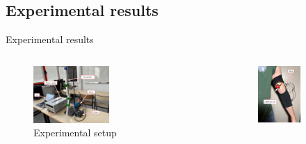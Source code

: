 \documentclass[aspectratio=169]{beamer}
\begin{document}
\subsection{Experimental results}
\begin{frame}{Experimental results}
\begin{columns}
\begin{column}{0.5\textwidth}
\begin{figure}[htbp]
  \centering
  \includegraphics[width=0.6\textwidth]{setup.png}
  \caption{Experimental setup}
  \label{fig:setup}
\end{figure}
\end{column}
\begin{column}{0.5\textwidth}
\begin{figure}[htbp]
    \centering
    \begin{subfigure}{0.3\textwidth}
        \centering
        \includegraphics[width=\linewidth]{front_view.png}

\end{subfigure}
\end{figure}
\end{column}
\end{columns}
\end{frame}
\end{document}
